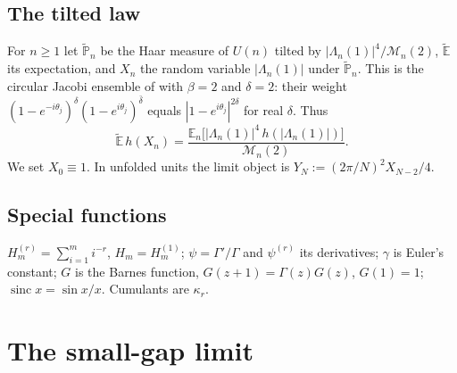 \documentclass[12pt]{amsart}
\theoremstyle{remark}
\newcommand{\E}{\mathbb{E}}
\newcommand{\Et}{\widetilde{\mathbb{E}}}
\newcommand{\1}{\mathbf{1}}
\newcommand{\sinc}{\operatorname{sinc}}
\begin{document}
\subsection*{The tilted law}
For $n\ge1$ let $\widetilde{\mathbb P}_n$ be the Haar measure of $U(n)$
tilted by $|\Lambda_n(1)|^4/\mathcal M_n(2)$, $\Et$ its
expectation, and $X_n$ the random variable $|\Lambda_n(1)|$ under
$\widetilde{\mathbb P}_n$. This is the circular Jacobi ensemble of
\cite[Def.~1.1]{BNR09} with $\beta=2$ and $\delta=2$: their weight
$(1-e^{-i\theta_j})^{\delta}(1-e^{i\theta_j})^{\bar\delta}$ equals
$|1-e^{i\theta_j}|^{2\delta}$ for real $\delta$. Thus
\[
\Et\, h(X_n)=\frac{\E_n\big[|\Lambda_n(1)|^4\,h(|\Lambda_n(1)|)\big]}
{\mathcal M_n(2)} .
\]
We set $X_0\equiv1$. In unfolded units the limit object is
$Y_N:=(2\pi/N)^2X_{N-2}/4$.

\subsection*{Special functions}
$H_m^{(r)}=\sum_{i=1}^m i^{-r}$, $H_m=H_m^{(1)}$; $\psi=\Gamma'/\Gamma$
and $\psi^{(r)}$ its derivatives; $\gamma$ is Euler's constant; $G$ is the
Barnes function, $G(z+1)=\Gamma(z)G(z)$, $G(1)=1$;
$\sinc x=\sin x/x$. Cumulants are $\kappa_r$.

\section{The small-gap limit}\label{sec:thm1}
\end{document}
